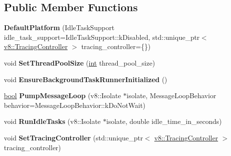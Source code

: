 \subsection*{Public Member Functions}
\begin{DoxyCompactItemize}
\item 
\mbox{\label{classv8_1_1platform_1_1DefaultPlatform_a22897d0a7df7a614975d59909a7e2940}} 
{\bfseries Default\+Platform} (Idle\+Task\+Support idle\+\_\+task\+\_\+support=Idle\+Task\+Support\+::k\+Disabled, std\+::unique\+\_\+ptr$<$ \mbox{\hyperlink{classv8_1_1TracingController}{v8\+::\+Tracing\+Controller}} $>$ tracing\+\_\+controller=\{\})
\item 
\mbox{\label{classv8_1_1platform_1_1DefaultPlatform_a7dcc9c2ff945dfa873df908419b52599}} 
void {\bfseries Set\+Thread\+Pool\+Size} (\mbox{\hyperlink{classint}{int}} thread\+\_\+pool\+\_\+size)
\item 
\mbox{\label{classv8_1_1platform_1_1DefaultPlatform_a7ad121414a3d4e5779fae9d4afd751ba}} 
void {\bfseries Ensure\+Background\+Task\+Runner\+Initialized} ()
\item 
\mbox{\label{classv8_1_1platform_1_1DefaultPlatform_ac7d53e62683ecf2098da089b60aafda2}} 
\mbox{\hyperlink{classbool}{bool}} {\bfseries Pump\+Message\+Loop} (v8\+::\+Isolate $\ast$isolate, Message\+Loop\+Behavior behavior=Message\+Loop\+Behavior\+::k\+Do\+Not\+Wait)
\item 
\mbox{\label{classv8_1_1platform_1_1DefaultPlatform_a358a8f892ad44ed1d97b13f44be0bcf0}} 
void {\bfseries Run\+Idle\+Tasks} (v8\+::\+Isolate $\ast$isolate, double idle\+\_\+time\+\_\+in\+\_\+seconds)
\item 
\mbox{\label{classv8_1_1platform_1_1DefaultPlatform_aa7d95aad0db131e1709fd44b6dd65a1e}} 
void {\bfseries Set\+Tracing\+Controller} (std\+::unique\+\_\+ptr$<$ \mbox{\hyperlink{classv8_1_1TracingController}{v8\+::\+Tracing\+Controller}} $>$ tracing\+\_\+controller)
\item 
\mbox{\label{classv8_1_1platform_1_1DefaultPlatform_a81b61879b99c4ef7e5562aa548045f42}} 

\end{DoxyCompactItemize}
